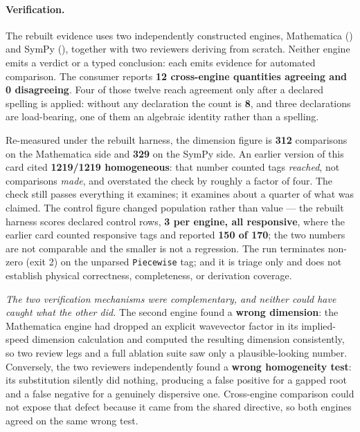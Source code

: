 \paragraph{Verification.}
The rebuilt evidence uses two independently constructed engines, Mathematica
()
and SymPy
(),
together with two reviewers deriving from scratch. Neither engine emits a
verdict or a typed conclusion: each emits evidence for automated comparison.
The consumer reports \textbf{12 cross-engine quantities agreeing and 0
disagreeing}. Four of those twelve reach agreement only after a declared
spelling is applied: without any declaration the count is \textbf{8}, and three
declarations are load-bearing, one of them an algebraic identity rather than a
spelling.

Re-measured under the rebuilt harness, the dimension figure is \textbf{312}
comparisons on the Mathematica side and \textbf{329} on the SymPy side. An
earlier version of this card cited \textbf{1219/1219 homogeneous}: that number
counted tags \emph{reached}, not comparisons \emph{made}, and overstated the
check by roughly a factor of four. The check still passes everything it
examines; it examines about a quarter of what was claimed. The control figure
changed population rather than value --- the rebuilt harness scores declared
control rows, \textbf{3 per engine, all responsive}, where the earlier card
counted responsive tags and reported \textbf{150 of 170}; the two numbers are
not comparable and the smaller is not a regression. The run terminates non-zero
(exit 2) on the unparsed \texttt{Piecewise} tag; and it is triage only and does
not establish physical correctness, completeness, or derivation coverage.

\emph{The two verification mechanisms were complementary, and neither could
have caught what the other did.} The second engine found a \textbf{wrong
dimension}: the Mathematica engine had dropped an explicit wavevector factor
in its implied-speed dimension calculation and computed the resulting
dimension consistently, so two review legs and a full ablation suite saw only
a plausible-looking number. Conversely, the two reviewers independently found
a \textbf{wrong homogeneity test}: its
substitution silently did nothing, producing a false positive for a gapped
root and a false negative for a genuinely dispersive one. Cross-engine
comparison could not expose that defect because it came from the shared
directive, so both engines agreed on the same wrong test.

